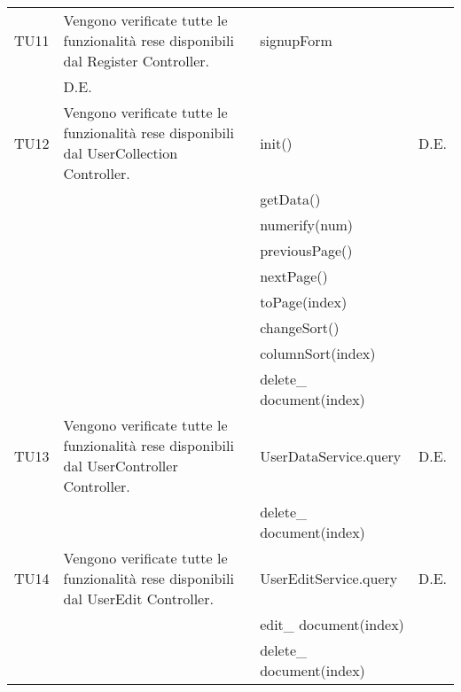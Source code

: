 \begin{center}
\begin{longtable}{|p{2cm}|p{7cm}|p{7cm}|p{2cm}|}
\midrule
TU11
& Vengono verificate tutte le funzionalità rese disponibili dal Register Controller.
& signupForm\\
& D.E.\\


\midrule
TU12
& Vengono verificate tutte le funzionalità rese disponibili dal UserCollection Controller.
& init()
& D.E.\\
& & getData()\\
& & numerify(num)\\
& & previousPage()\\
& & nextPage()\\
& & toPage(index)\\
& & changeSort()\\
& & columnSort(index)\\
& & delete\_ document(index)\\


\midrule
TU13
& Vengono verificate tutte le funzionalità rese disponibili dal UserController Controller.
& UserDataService.query
& D.E.\\
& & delete\_ document(index)\\



\midrule
TU14
& Vengono verificate tutte le funzionalità rese disponibili dal UserEdit Controller.
& UserEditService.query
& D.E.\\
& & edit\_ document(index)\\
& & delete\_ document(index)\\





\end{longtable}
\end{center}


